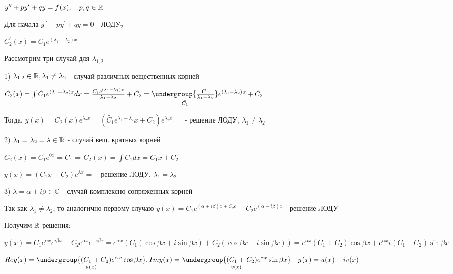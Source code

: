\documentclass[12pt]{article}
\begin{document}

    \Mem $y^{\prime\prime} + py^\prime + qy = f(x), \quad p, q \in \mathbb{R}$

    Для начала $y^{\prime\prime} + py^\prime + qy = 0$ - ЛОДУ$_2$

    $C^\prime_2 (x) = C_1 e^{(\lambda_1 - \lambda_2)x}$

    Рассмотрим три случай для $\lambda_{1,2}$

    \hypertarget{ldesgdifferentrealsolutions}{}

    1) $\lambda_{1.2} \in \mathbb{R}, \lambda_1 \neq \lambda_2$ - случай различных вещественных корней

    $C_2(x) = \int C_1 e^{(\lambda_1 - \lambda_2)x} dx = \frac{C_1 e^{(\lambda_1 - \lambda_2)x}}{\lambda_1 - \lambda_2} + C_2 =
    \underset{\tilde{C_1}}{\undergroup{\frac{C_1}{\lambda_1 - \lambda_2}}} e^{(\lambda_1 - \lambda_2)x} + C_2$

    Тогда, $y(x) = C_2(x) e^{\lambda_2 x} = (\tilde{C_1}e^{\lambda_1 - \lambda_2}x + C_2)e^{\lambda_2 x} = $ - решение ЛОДУ, $\lambda_1 \neq \lambda_2$

    \hypertarget{ldesgequalrealsolutions}{}

    2) $\lambda_1 = \lambda_2 = \lambda \in \mathbb{R}$ - случай вещ. кратных корней

    $C_2^\prime (x) = C_1 e^{0x} = C_1 \Longrightarrow C_2(x) = \int C_1 dx = C_1 x + C_2$

    $y(x) = (C_1 x + C_2)e^{\lambda x} = $ - решение ЛОДУ, $\lambda_1 = \lambda_2$

    \hypertarget{ldesgcomplexsolutions}{}

    3) $\lambda = \alpha \pm i \beta \in \mathbb{C}$ - случай комплексно сопряженных корней

    Так как $\lambda_1 \neq \lambda_2$, то аналогично первому случаю $y(x) = C_1 e^{(\alpha + i \beta)x + C_2 e} + C_2 e^{(\alpha - i \beta) x}$ - решение ЛОДУ

    Получим $\mathbb{R}$-решения:

    $y(x) = C_1 e^{\alpha x} e^{i\beta x} + C_2 e^{\alpha x} e^{-i\beta x} = e^{\alpha x} (C_1 (\cos\beta x + i\sin\beta x) + C_2 (\cos\beta x - i\sin \beta x)) =
    e^{\alpha x} (C_1 + C_2) \cos\beta x + e^{\alpha x} i (C_1 - C_2) \sin\beta x$

    $Re y(x) = \underset{u(x)}{\undergroup{(C_1 + C_2) e^{\alpha x} \cos\beta x}}, Im y(x) = \underset{v(x)}{\undergroup{(C_1 + C_2) e^{\alpha x} \sin\beta x}} \quad y(x) = u(x) + iv(x)$
\end{document}
